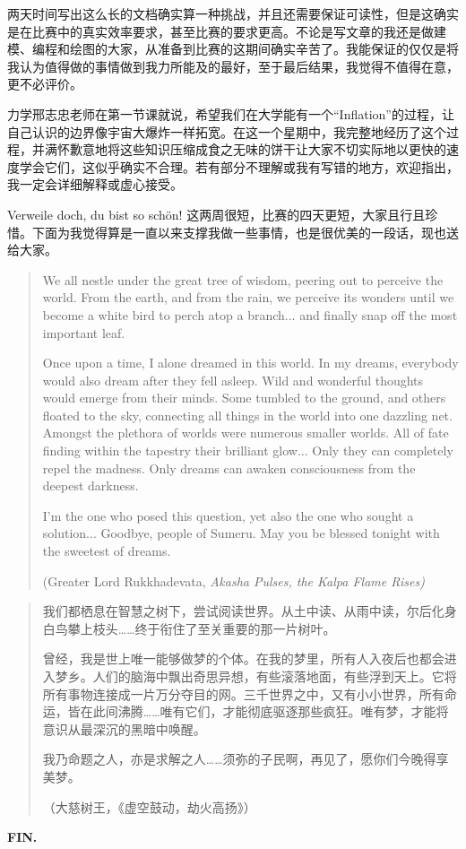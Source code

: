 \documentclass[a4paper, 12pt]{article}
\begin{document}
    两天时间写出这么长的文档确实算一种挑战，并且还需要保证可读性，但是这确实是在比赛中的真实效率要求，甚至比赛的要求更高。不论是写文章的我还是做建模、编程和绘图的大家，从准备到比赛的这期间确实辛苦了。我能保证的仅仅是将我认为值得做的事情做到我力所能及的最好，至于最后结果，我觉得不值得在意，更不必评价。

    力学邢志忠老师在第一节课就说，希望我们在大学能有一个“Inflation”的过程，让自己认识的边界像宇宙大爆炸一样拓宽。在这一个星期中，我完整地经历了这个过程，并满怀歉意地将这些知识压缩成食之无味的饼干让大家不切实际地以更快的速度学会它们，这似乎确实不合理。若有部分不理解或我有写错的地方，欢迎指出，我一定会详细解释或虚心接受。

    Verweile doch, du bist so schön! 这两周很短，比赛的四天更短，大家且行且珍惜。下面为我觉得算是一直以来支撑我做一些事情，也是很优美的一段话，现也送给大家。

    \begin{quotation}
    We all nestle under the great tree of wisdom, peering out to perceive the world. From the earth, and from the rain, we perceive its wonders until we become a white bird to perch atop a branch... and finally snap off the most important leaf. 

    Once upon a time, I alone dreamed in this world. In my dreams, everybody would also dream after they fell asleep. Wild and wonderful thoughts would emerge from their minds. Some tumbled to the ground, and others floated to the sky, connecting all things in the world into one dazzling net. Amongst the plethora of worlds were numerous smaller worlds. All of fate finding within the tapestry their brilliant glow... Only they can completely repel the madness. Only dreams can awaken consciousness from the deepest darkness. 

    I'm the one who posed this question, yet also the one who sought a solution... Goodbye, people of Sumeru. May you be blessed tonight with the sweetest of dreams.

    \noindent (Greater Lord Rukkhadevata, \it{Akasha Pulses, the Kalpa Flame Rises}\rm)
    \end{quotation}

    \begin{quotation}
    我们都栖息在智慧之树下，尝试阅读世界。从土中读、从雨中读，尔后化身白鸟攀上枝头……终于衔住了至关重要的那一片树叶。

    曾经，我是世上唯一能够做梦的个体。在我的梦里，所有人入夜后也都会进入梦乡。人们的脑海中飘出奇思异想，有些滚落地面，有些浮到天上。它将所有事物连接成一片万分夺目的网。三千世界之中，又有小小世界，所有命运，皆在此间沸腾……唯有它们，才能彻底驱逐那些疯狂。唯有梦，才能将意识从最深沉的黑暗中唤醒。

    我乃命题之人，亦是求解之人……须弥的子民啊，再见了，愿你们今晚得享美梦。

    \noindent （大慈树王，《虚空鼓动，劫火高扬》）
    \end{quotation}
    
    \textbf{FIN.}
    
\end{document}
